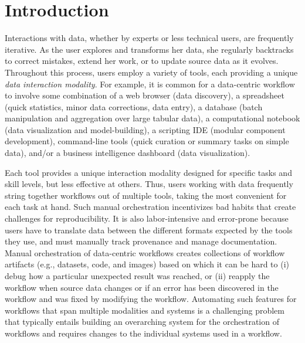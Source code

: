 
\section{Introduction}
\label{sec:introduction}

Interactions with data, whether by experts or less technical users, are frequently iterative.
As the user explores and transforms her data, she regularly backtracks to correct mistakes, extend her work, or to update source data as it evolves.
Throughout this process, users employ a variety of tools, each providing a unique \emph{data interaction modality}.
For example, it is common for a data-centric workflow to involve some combination of a web browser (data discovery), a spreadsheet (quick statistics, minor data corrections, data entry), a database (batch manipulation and aggregation over large tabular data), a computational notebook (data visualization and model-building), a scripting IDE (modular component development), command-line tools (quick curation or summary tasks on simple data), and/or a business intelligence dashboard (data visualization).

Each tool provides a unique interaction modality %
designed for specific tasks and skill levels, but less effective at others.
Thus, users working with data frequently string together workflows out of multiple tools, taking the most convenient for each task at hand.
Such manual orchestration %
incentivizes bad habits that create challenges for reproducibility.
It is also labor-intensive and error-prone because users have to translate data between the different formats expected by the tools they use, and must manually track provenance and manage documentation.
Manual orchestration of data-centric workflows %
creates collections of workflow artifacts (e.g., datasets, code, and images) based on which it can be hard to (i) debug how a particular unexpected result was reached, or (ii) reapply the workflow when source data changes or if an error has been discovered %
in the workflow and was fixed by modifying the workflow. Automating such features for workflows that span multiple modalities and systems is a challenging problem that typically entails building an overarching system for the orchestration of workflows and requires changes to the individual systems used in a workflow.

